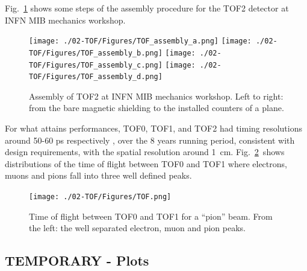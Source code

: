 Fig.~\ref{fig:TOF2} shows some steps of the assembly procedure for the TOF2
detector at INFN MIB mechanics workshop.
\begin{figure}
  \begin{center}
  \texttt{[image: ./02-TOF/Figures/TOF\_assembly\_a.png]}
  \texttt{[image: ./02-TOF/Figures/TOF\_assembly\_b.png]}
  \texttt{[image: ./02-TOF/Figures/TOF\_assembly\_c.png]}
  \texttt{[image: ./02-TOF/Figures/TOF\_assembly\_d.png]}
  \caption{Assembly of TOF2 at INFN MIB mechanics workshop. Left to right: from the bare magnetic shielding to the installed counters of a plane.}
  \label{fig:TOF2}
  \end{center}
\end{figure}




For what attains performances, TOF0, TOF1, and TOF2 had timing
resolutions around 50-60 ps respectively ,
over the 8 years running period, consistent with design requirements,
with the spatial resolution around 1~cm. 
Fig.~\ref{fig:TOF3}~shows distributions of the time of flight between TOF0 and TOF1 where electrons, muons and pions fall into three well defined peaks.
\begin{figure}
  \begin{center}
    \texttt{[image: ./02-TOF/Figures/TOF.png]}
    \caption{Time of flight between TOF0 and TOF1 for a ``pion'' beam. From the left: the well separated electron, muon and pion peaks.}
    \label{fig:TOF3}
  \end{center}
\end{figure}




\subsection{TEMPORARY - Plots}

